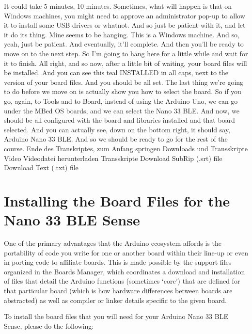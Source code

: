     It could take 5 minutes, 10 minutes.
    Sometimes, what will happen is that on Windows machines,
    you might need to approve an administrator pop-up to allow it
    to install some USB drivers or whatnot.
    And so just be patient with it, and let it do its thing.
    Mine seems to be hanging.
    This is a Windows machine.
    And so, yeah, just be patient.
    And eventually, it'll complete.
    And then you'll be ready to move on to the next step.
    So I'm going to hang here for a little while and wait for it to finish.
    All right, and so now, after a little bit of waiting,
    your board files will be installed.
    And you can see this teal INSTALLED in all caps,
    next to the version of your board files.
    And you should be all set.
    The last thing we're going to do before we move on is actually show you
    how to select the board.
    So if you go, again, to Tools and to Board,
    instead of using the Arduino Uno, we can go under the MBed OS boards,
    and we can select the Nano 33 BLE.
    And now, we should be all configured with the board and libraries installed
    and that board selected.
    And you can actually see, down on the bottom right, it should say,
    Arduino Nano 33 BLE.
    And so we should be ready to go for the rest of the course.
    Ende des Transkriptes, zum Anfang springen
    Downloads und Transskripte
    Video
    Videodatei herunterladen
    Transskripte
    Download SubRip (.srt) file
    Download Text (.txt) file

\section{Installing the Board Files for the Nano 33 BLE Sense}


    One of the primary advantages that the Arduino ecosystem affords is the portability of code you write for one or another board within their line-up or even in porting code to affiliate boards. This is made possible by the support files organized in the Boards Manager, which coordinates a download and installation of files that detail the Arduino functions (sometimes ‘core’) that are defined for that particular board (which is how hardware differences between boards are abstracted) as well as compiler or linker details specific to the given board.
    
    To install the board files that you will need for your Arduino Nano 33 BLE Sense, please do the following:

